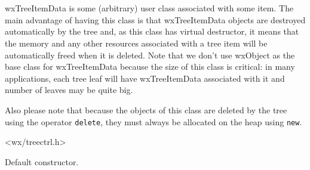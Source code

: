 \section{}\label{wxtreeitemdata}

wxTreeItemData is some (arbitrary) user class associated with some item. The
main advantage of having this class is that wxTreeItemData objects are
destroyed automatically by the tree and, as this class has virtual destructor,
it means that the memory and any other resources associated with a tree item
will be automatically freed when it is deleted. Note that we don't use wxObject
as the base class for wxTreeItemData because the size of this class is
critical: in many applications, each tree leaf will have wxTreeItemData
associated with it and number of leaves may be quite big.

Also please note that because the objects of this class are deleted by the tree
using the operator {\tt delete}, they must always be allocated on the heap
using {\tt new}.




<wx/treectrl.h>




\label{wxtreeitemdatactor}


Default constructor.



